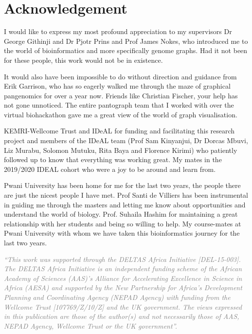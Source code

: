 \documentclass[10pt, a4paper]{article}
\begin{document}
\newpage
\section{Acknowledgement}
\label{sec:orgdd3736b}
I would like to express my most profound appreciation to my supervisors
Dr George Githinji and Dr Pjotr Prins and Prof James Nokes, who introduced me to
the world of bioinformatics and more specifically genome graphs. Had it not been
for these people, this work would not be in existence.

It would also have been impossible to do without direction and guidance from
Erik Garrison, who has so eagerly walked me through the maze of graphical
pangenomics for over a year now. Friends like Christian Fischer, your help has
not gone unnoticed. The entire pantograph team that I worked with over the
virtual biohackathon gave me a great view of the world of graph visualisation.

KEMRI-Wellcome Trust and IDeAL for funding and facilitating this research
project and members of the IDeAL team (Prof Sam Kinyanjui, Dr Dorcas Mbuvi,
Liz Murabu, Solomon Mutuku, Rita Baya and Florence Kirimi) who patiently
followed up to know that everything was working great. My mates in the 2019/2020
IDEAL cohort who were a joy to be around and learn from.

Pwani University has been home for me for the last two years, the people there
are just the nicest people I have met. Prof Santi de Villiers has been
instrumental in guiding me through the masters and letting me know about
opportunities and understand the world of biology.
Prof. Suhaila Hashim for maintaining a great relationship with her students and
being so willing to help. My course-mates at Pwani University with whom we have
taken this bioinformatics journey for the last two years.

\textcolor{gray}{\emph{
“This work was supported through the DELTAS Africa Initiative [DEL-15-003].
The DELTAS Africa Initiative is an independent funding scheme of the
African Academy of Sciences (AAS)'s Alliance for Accelerating Excellence in
Science in Africa (AESA) and supported by the New Partnership for Africa's
Development Planning and Coordinating Agency (NEPAD Agency) with funding from
the Wellcome Trust [107769/Z/10/Z] and the UK government.
The views expressed in this publication are those of the author(s) and not
necessarily those of AAS, NEPAD Agency, Wellcome Trust or the UK government”.
}}

\newpage
\pagewidth
\end{document}
